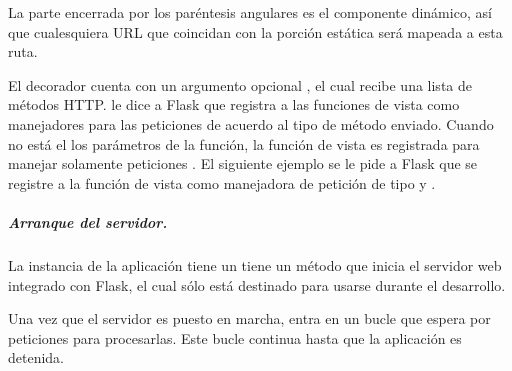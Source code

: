 La parte encerrada por los paréntesis angulares es el componente dinámico, así
que cualesquiera URL que coincidan con la porción estática será mapeada a esta
ruta.

El decorador  cuenta con un argumento opcional ,
el cual recibe
una lista de métodos HTTP.  le dice a Flask que registra a las
funciones de vista como manejadores para las peticiones de acuerdo
al tipo de método enviado. Cuando  no está el los parámetros de la
función, la función de vista es registrada para manejar solamente peticiones
. El siguiente ejemplo se le pide a Flask que se registre a la
función de vista como manejadora de petición de tipo  y .

\begin{sphinxVerbatim}[commandchars=\\\{\}]
 \PYG{p}{[} \PYG{p}{]}
 
   
\end{sphinxVerbatim}


\subparagraph{Arranque del servidor.}
\label{\detokenize{chapter_two/desc_cloudnao:arranque-del-servidor}}
La instancia de la aplicación tiene un tiene un método  que inicia el
servidor web integrado con Flask, el cual sólo está destinado para usarse
durante el desarrollo.

\begin{sphinxVerbatim}[commandchars=\\\{\}]
   
\end{sphinxVerbatim}

Una vez que el servidor es puesto en marcha, entra en un bucle que espera por
peticiones para procesarlas. Este bucle continua hasta que la aplicación es
detenida.

